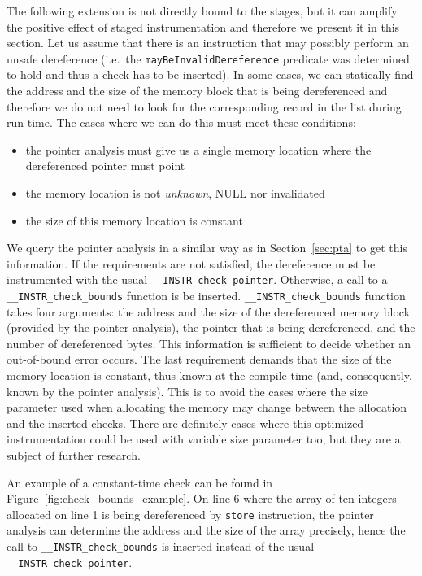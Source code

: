 The following extension is not directly bound to the stages, but it
can amplify the positive effect of staged instrumentation and
therefore we present it in this section. Let us assume that there is
an instruction that may possibly perform an unsafe dereference
(i.e.~the \texttt{mayBeInvalidDereference} predicate was determined to
hold and thus a check has to be inserted). In some cases, we can
statically find the address and the size of the memory block that is
being dereferenced and therefore we do not need to look for the
corresponding record in the list during run-time. The cases where we
can do this must meet these conditions:
\begin{itemize}
\item the pointer analysis must give us a single memory location where the
dereferenced pointer must point
\item the memory location is not \emph{unknown}, NULL nor invalidated
\item the size of this memory location is constant
\end{itemize}

We query the pointer analysis in a similar way as in
Section~\ref{sec:pta} to get this information.  If the requirements
are not satisfied, the dereference must be instrumented with the usual
\texttt{\_\_INSTR\_check\_pointer}. Otherwise, a call to a
\texttt{\_\_INSTR\_check\_bounds} function is be
inserted. \texttt{\_\_INSTR\_check\_bounds} function takes four
arguments: the address and the size of the dereferenced memory block
(provided by the pointer analysis), the pointer that is being
dereferenced, and the number of dereferenced bytes.  This information
is sufficient to decide whether an out-of-bound error occurs.  The
last requirement demands that the size of the memory location is
constant, thus known at the compile time (and, consequently, known by
the pointer analysis).  This is to avoid the cases where the size
parameter used when allocating the memory may change between the
allocation and the inserted checks.  There are definitely cases where
this optimized instrumentation could be used with variable size
parameter too, but they are a subject of further research.

An example of a constant-time check can be found in
Figure~\ref{fig:check_bounds_example}. On line 6 where the array of ten
integers allocated on line 1 is being dereferenced by \texttt{store}
instruction, the pointer analysis can determine the address and the size of the
array precisely, hence the call to \texttt{\_\_INSTR\_check\_bounds} is
inserted instead of the usual \texttt{\_\_INSTR\_check\_pointer}.

